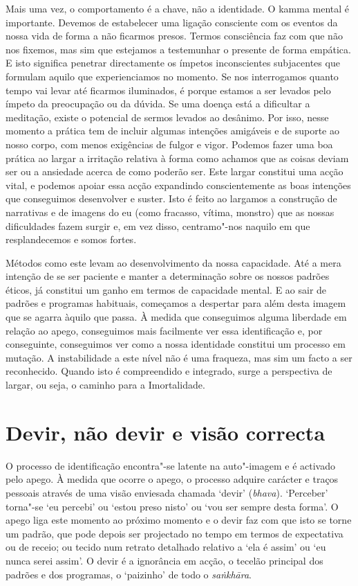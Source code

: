 Mais uma vez, o comportamento é a chave, não a identidade. O kamma mental é importante. Devemos de estabelecer uma ligação consciente com os eventos da nossa vida de forma a não ficarmos presos. Termos consciência faz com que não nos fixemos, mas sim que estejamos a testemunhar o presente de forma empática. E isto significa penetrar directamente os ímpetos inconscientes subjacentes que formulam aquilo que experienciamos no momento. Se nos interrogamos quanto tempo vai levar até ficarmos iluminados, é porque estamos a ser levados pelo ímpeto da preocupação ou da dúvida. Se uma doença está a dificultar a meditação, existe o potencial de sermos levados ao desânimo. Por isso, nesse momento a prática tem de incluir algumas intenções amigáveis e de suporte ao nosso corpo, com menos exigências de fulgor e vigor. Podemos fazer uma boa prática ao largar a irritação relativa à forma como achamos que as coisas deviam ser ou a ansiedade acerca de como poderão ser. Este largar constitui uma acção vital, e podemos apoiar essa acção expandindo conscientemente as boas intenções que conseguimos desenvolver e suster. Isto é feito ao largamos a construção de narrativas e de imagens do eu (como fracasso, vítima, monstro) que as nossas dificuldades fazem surgir e, em vez disso, centramo"-nos naquilo em que resplandecemos e somos fortes.

Métodos como este levam ao desenvolvimento da nossa capacidade. Até a mera intenção de se ser paciente e manter a determinação sobre os nossos padrões éticos, já constitui um ganho em termos de capacidade mental. E ao sair de padrões e programas habituais, começamos a despertar para além desta imagem que se agarra àquilo que passa. À medida que conseguimos alguma liberdade em relação ao apego, conseguimos mais facilmente ver essa identificação e, por conseguinte, conseguimos ver como a nossa identidade constitui um processo em mutação. A instabilidade a este nível não é uma fraqueza, mas sim um facto a ser reconhecido. Quando isto é compreendido e integrado, surge a perspectiva de largar, ou seja, o caminho para a Imortalidade.

\section{Devir, não devir e visão correcta}

O processo de identificação encontra"-se latente na auto"-imagem e é activado pelo apego. À medida que ocorre o apego, o processo adquire carácter e traços pessoais através de uma visão enviesada chamada `devir' (\emph{bhava}). `Perceber' torna"-se `eu percebi' ou `estou preso nisto' ou `vou ser sempre desta forma'. O apego liga este momento ao próximo momento e o devir faz com que isto se torne um padrão, que pode depois ser projectado no tempo em termos de expectativa ou de receio; ou tecido num retrato detalhado relativo a `ela é assim' ou `eu nunca serei assim'. O devir é a ignorância em acção, o tecelão principal dos padrões e dos programas, o `paizinho' de todo o \emph{saṅkhāra}.


